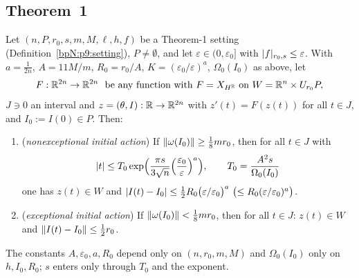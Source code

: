 \subsection{Theorem~1}\label{bpN:p9:s-thm}

\begin{theorem}\label{bpN:p9:thm1}
Let $(n,P,r_0,s,m,M,\ell,h,f)$ be a Theorem-1 setting (Definition~\ref{bpN:p9:setting}), $P\ne\emptyset$, and let $\varepsilon\in(0,\varepsilon_0]$ with $\lvert f\rvert_{r_0,s}\le\varepsilon$. With $a=\frac1{2n}$, $A=11M/m$, $R_0=r_0/A$, $K=(\varepsilon_0/\varepsilon)^a$, $\Omega_0(I_0)$ as above, let
\[F:\mathbb{R}^{2n}\to\mathbb{R}^{2n}\ \text{ be any function with }F=X_{H^{\mathbb{R}}}\text{ on }W=\mathbb{R}^n\times U_{r_0}P,\]
$J\ni0$ an interval and $z=(\theta,I):\mathbb{R}\to\mathbb{R}^{2n}$ with $z'(t)=F(z(t))$ for all $t\in J$, and $I_0:=I(0)\in P$. Then:
\begin{enumerate}[label=(\alph*)]
\item (\emph{nonexceptional initial action}) If $\lVert \omega(I_0)\rVert\ge\frac18mr_0$, then for all $t\in J$ with
\[\lvert t\rvert\le T_0\exp\Bigl(\frac{\pi s}{3\sqrt n}\Bigl(\frac{\varepsilon_0}\varepsilon\Bigr)^a\Bigr),\qquad T_0=\frac{A^2s}{\Omega_0(I_0)}\]
one has $z(t)\in W$ and $\abs{I(t)-I_0}\le\tfrac12R_0\bigl(\varepsilon/\varepsilon_0\bigr)^a\ \bigl(\le R_0(\varepsilon/\varepsilon_0)^a\bigr)$.
\item (\emph{exceptional initial action}) If $\lVert \omega(I_0)\rVert<\frac18mr_0$, then for all $t\in J$: $z(t)\in W$ and $\lVert I(t)-I_0\rVert\le\frac12r_0$.
\end{enumerate}
The constants $A,\varepsilon_0,a,R_0$ depend only on $(n,r_0,m,M)$ and $\Omega_0(I_0)$ only on $h,I_0,R_0$; $s$ enters only through $T_0$ and the exponent.
\end{theorem}
